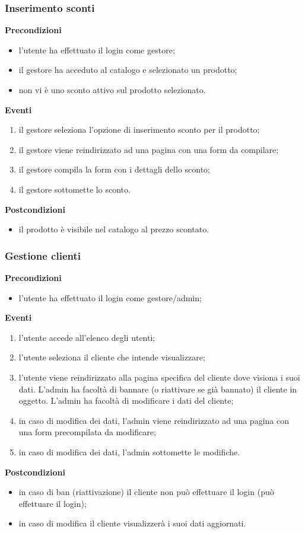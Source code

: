 \documentclass[a4paper, 14pt]{article}
\begin{document}
\begin{flushleft}
			\bigskip
			\subsubsection{Inserimento sconti}
			\textbf{Precondizioni}
			\begin{itemize}
				\item l'utente ha effettuato il login come gestore;
				\item il gestore ha acceduto al catalogo e selezionato un prodotto;
				\item non vi è uno sconto attivo sul prodotto selezionato.
			\end{itemize}
			\textbf{Eventi}
			\begin{enumerate}
				\item il gestore seleziona l'opzione di inserimento sconto per il prodotto;
				\item il gestore viene reindirizzato ad una pagina con una form da compilare;
				\item il gestore compila la form con i dettagli dello sconto;
				\item il gestore sottomette lo sconto.
			\end{enumerate}
			\textbf{Postcondizioni}
			\begin{itemize}
				\item il prodotto è visibile nel catalogo al prezzo scontato.
			\end{itemize}
		
			\bigskip
			\subsubsection{Gestione clienti}
			\textbf{Precondizioni}
			\begin{itemize}
				\item l'utente ha effettuato il login come gestore/admin;
			\end{itemize}
			\textbf{Eventi}
			\begin{enumerate}
				\item l'utente accede all'elenco degli utenti;
				\item l'utente seleziona il cliente che intende visualizzare;
				\item l'utente viene reindirizzato alla pagina specifica del cliente dove visiona i suoi dati.
					  L'admin ha facoltà di bannare (o riattivare se già bannato) il cliente in oggetto.
					  L'admin ha facoltà di modificare i dati del cliente;
				\item in caso di modifica dei dati, l'admin viene reindirizzato ad una pagina con una form precompilata
					  da modificare;
				\item in caso di modifica dei dati, l'admin sottomette le modifiche.
			\end{enumerate}
			\textbf{Postcondizioni}
			\begin{itemize}
				\item in caso di ban (riattivazione) il cliente non può effettuare il login (può effettuare il login);
				\item in caso di modifica il cliente visualizzerà i suoi dati aggiornati.
			\end{itemize}
			

\end{flushleft}
\end{document}
